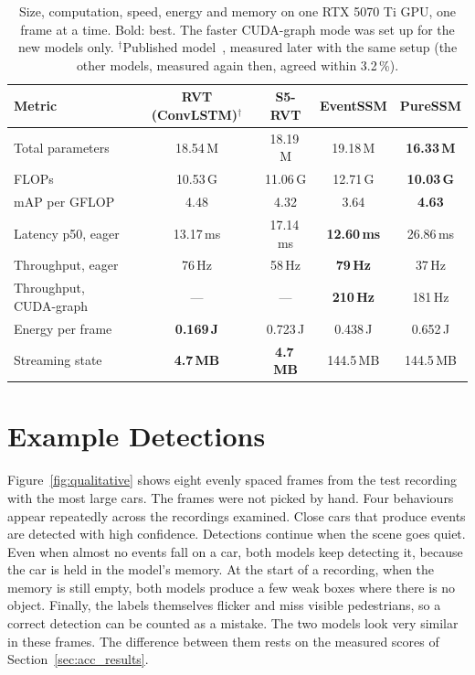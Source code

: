 \documentclass[11pt, a4paper]{report}
\begin{document}
\begin{table}[htbp]
\centering
\caption[Efficiency of the non-spiking models]{Size, computation, speed, energy and memory on one RTX 5070 Ti GPU, one frame at a time. Bold:
    best. The faster CUDA-graph mode was set up for the new models only. $^{\dagger}$Published
    model~\cite{gehrig2023recurrent}, measured later with the same setup (the other models, measured again
    then, agreed within 3.2\,\%).}
\label{tab:efficiency}
\begin{tabular}{lcccc}
\toprule
\textbf{Metric} & \textbf{RVT (ConvLSTM)}$^{\dagger}$ & \textbf{S5-RVT} & \textbf{EventSSM} & \textbf{PureSSM} \\
\midrule
Total parameters       & 18.54\,M & 18.19\,M & 19.18\,M & \textbf{16.33\,M} \\
FLOPs                  & 10.53\,G & 11.06\,G & 12.71\,G & \textbf{10.03\,G} \\
mAP per GFLOP          & 4.48 & 4.32 & 3.64 & \textbf{4.63} \\
Latency p50, eager     & 13.17\,ms & 17.14\,ms & \textbf{12.60\,ms} & 26.86\,ms \\
Throughput, eager      & 76\,Hz & 58\,Hz & \textbf{79\,Hz} & 37\,Hz \\
Throughput, CUDA-graph & --- & --- & \textbf{210\,Hz} & 181\,Hz \\
Energy per frame       & \textbf{0.169\,J} & 0.723\,J & 0.438\,J & 0.652\,J \\
Streaming state        & \textbf{4.7\,MB} & \textbf{4.7\,MB} & 144.5\,MB & 144.5\,MB \\
\bottomrule
\end{tabular}
\end{table}

\section{Example Detections}
\label{sec:qualitative}
Figure~\ref{fig:qualitative} shows eight evenly spaced frames from the test recording with the most large cars. The frames were not picked by hand. Four behaviours appear repeatedly across the recordings examined.
Close cars that produce events are detected with high confidence. Detections continue when the scene goes quiet. Even when almost no events fall on a car, both models keep detecting it, because the car is held in
the model's memory. At the start of a recording, when the memory is still empty, both models produce a few
weak boxes where there is no object. Finally, the labels themselves flicker and miss visible pedestrians,
so a correct detection can be counted as a mistake. The two models look very similar in these frames. The
difference between them rests on the measured scores of Section~\ref{sec:acc_results}.
\end{document}
